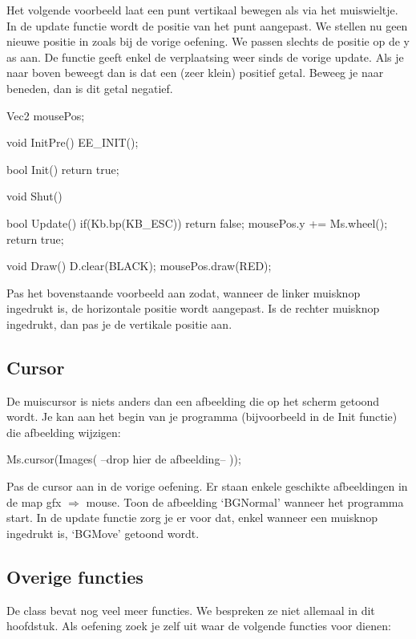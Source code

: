 Het volgende voorbeeld laat een punt vertikaal bewegen als via het muiswieltje. In de update functie wordt de positie van het punt aangepast. We stellen nu geen nieuwe positie in zoals bij de vorige oefening. We passen slechts de positie op de y as aan. De functie  geeft enkel de verplaatsing weer sinds de vorige update. Als je naar boven beweegt dan is dat een (zeer klein) positief getal. Beweeg je naar beneden, dan is dit getal negatief.

\begin{code}
Vec2 mousePos;

void InitPre()
{
   EE_INIT();
}

bool Init()
{   
   return true;
}

void Shut() {}

bool Update()
{
   if(Kb.bp(KB_ESC)) return false;  
   mousePos.y += Ms.wheel();  
   return true;
}

void Draw()
{
   D.clear(BLACK);
   mousePos.draw(RED);
}
\end{code}

\begin{exercise}
Pas het bovenstaande voorbeeld aan zodat, wanneer de linker muisknop ingedrukt is, de horizontale positie wordt aangepast. Is de rechter muisknop ingedrukt, dan pas je de vertikale positie aan.
\end{exercise} 

\subsection{Cursor}
De muiscursor is niets anders dan een afbeelding die op het scherm getoond wordt. Je kan aan het begin van je programma (bijvoorbeeld in de Init functie) die afbeelding wijzigen:

\begin{code}
  Ms.cursor(Images( --drop hier de afbeelding-- ));
\end{code}

\begin{exercise}
Pas de cursor aan in de vorige oefening. Er staan enkele geschikte afbeeldingen in de map gfx $\Rightarrow$ mouse. Toon de afbeelding `BGNormal' wanneer het programma start. In de update functie zorg je er voor dat, enkel wanneer een muisknop ingedrukt is, `BGMove' getoond wordt.
\end{exercise}

\subsection{Overige functies}
De class  bevat nog veel meer functies. We bespreken ze niet allemaal in dit hoofdstuk. Als oefening zoek je zelf uit waar de volgende functies voor dienen: 

